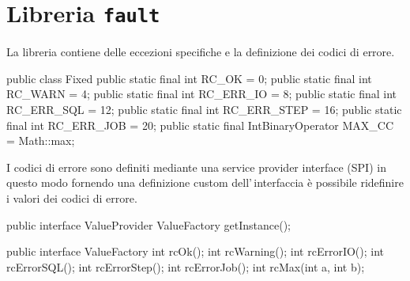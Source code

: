 \chapter{Libreria \texttt{fault}}
La libreria contiene delle eccezioni specifiche e la definizione dei codici di
errore.

\begin{elisting}[!htb]
\begin{javacode}
public class Fixed {
    public static final int RC_OK       =  0;
    public static final int RC_WARN     =  4;
    public static final int RC_ERR_IO   =  8;
    public static final int RC_ERR_SQL  = 12;
    public static final int RC_ERR_STEP = 16;
    public static final int RC_ERR_JOB  = 20;
    public static final IntBinaryOperator MAX_CC = Math::max;
}
\end{javacode}
\caption{Codici di errore, valori di default}
\label{lst:rc-def}
\end{elisting}

I codici di errore sono definiti mediante una service provider interface (SPI)
in questo modo fornendo una definizione custom dell'\,interfaccia è possibile
ridefinire i valori dei codici di errore.

\begin{elisting}[!htb]
\begin{javacode}
public interface ValueProvider {
    ValueFactory getInstance();
}
\end{javacode}
\caption{Interfaccia per fornire il generatore del valore degli errori}
\label{lst:val-prov}
\end{elisting}


\begin{elisting}[!htb]
\begin{javacode}
public interface ValueFactory {
    int rcOk();
    int rcWarning();
    int rcErrorIO();
    int rcErrorSQL();
    int rcErrorStep();
    int rcErrorJob();
    int rcMax(int a, int b);
}
\end{javacode}
\caption{Interfaccia per fornire il valore dei codici di errore}
\label{lst:val-fact}
\end{elisting}
